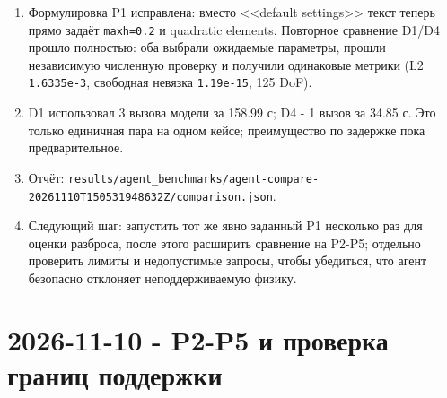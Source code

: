 \documentclass[11pt,a4paper]{article}
\begin{document}
\begin{enumerate}
    \item Формулировка P1 исправлена: вместо <<default settings>> текст теперь прямо задаёт \texttt{maxh=0.2} и quadratic elements. Повторное сравнение D1/D4 прошло полностью: оба выбрали ожидаемые параметры, прошли независимую численную проверку и получили одинаковые метрики (L2 \texttt{1.6335e-3}, свободная невязка \texttt{1.19e-15}, 125 DoF).
    \item D1 использовал 3 вызова модели за 158.99 с; D4 - 1 вызов за 34.85 с. Это только единичная пара на одном кейсе; преимущество по задержке пока предварительное.
    \item Отчёт: \texttt{results/agent\_benchmarks/agent-compare-20261110T150531948632Z/comparison.json}.
    \item Следующий шаг: запустить тот же явно заданный P1 несколько раз для оценки разброса, после этого расширить сравнение на P2-P5; отдельно проверить лимиты и недопустимые запросы, чтобы убедиться, что агент безопасно отклоняет неподдерживаемую физику.
\end{enumerate}

\section{2026-11-10 - P2-P5 и проверка границ поддержки}
\end{document}
